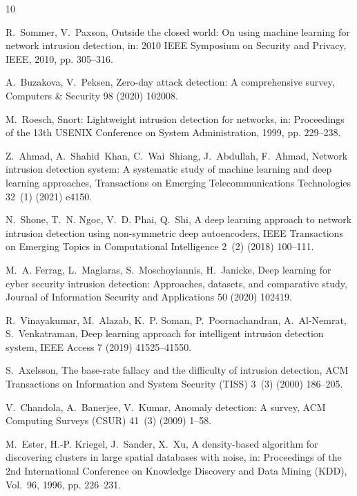 \documentclass[preprint,12pt]{elsarticle}
\begin{document}

\begin{thebibliography}{10}

R.~Sommer, V.~Paxson,
\newblock Outside the closed world: On using machine learning for network intrusion detection,
\newblock in: 2010 IEEE Symposium on Security and Privacy, IEEE, 2010, pp. 305--316.

A.~Buzakova, V.~Peksen,
\newblock Zero-day attack detection: A comprehensive survey,
\newblock Computers \& Security 98 (2020) 102008.

M.~Roesch,
\newblock Snort: Lightweight intrusion detection for networks,
\newblock in: Proceedings of the 13th USENIX Conference on System Administration, 1999, pp. 229--238.

Z.~Ahmad, A.~Shahid~Khan, C.~Wai~Shiang, J.~Abdullah, F.~Ahmad,
\newblock Network intrusion detection system: A systematic study of machine learning and deep learning approaches,
\newblock Transactions on Emerging Telecommunications Technologies 32~(1) (2021) e4150.

N.~Shone, T.~N. Ngoc, V.~D. Phai, Q.~Shi,
\newblock A deep learning approach to network intrusion detection using non-symmetric deep autoencoders,
\newblock IEEE Transactions on Emerging Topics in Computational Intelligence 2~(2) (2018) 100--111.

M.~A. Ferrag, L.~Maglaras, S.~Moschoyiannis, H.~Janicke,
\newblock Deep learning for cyber security intrusion detection: Approaches, datasets, and comparative study,
\newblock Journal of Information Security and Applications 50 (2020) 102419.

R.~Vinayakumar, M.~Alazab, K.~P. Soman, P.~Poornachandran, A.~Al-Nemrat, S.~Venkatraman,
\newblock Deep learning approach for intelligent intrusion detection system,
\newblock IEEE Access 7 (2019) 41525--41550.

S.~Axelsson,
\newblock The base-rate fallacy and the difficulty of intrusion detection,
\newblock ACM Transactions on Information and System Security (TISS) 3~(3) (2000) 186--205.

V.~Chandola, A.~Banerjee, V.~Kumar,
\newblock Anomaly detection: A survey,
\newblock ACM Computing Surveys (CSUR) 41~(3) (2009) 1--58.

M.~Ester, H.-P. Kriegel, J.~Sander, X.~Xu,
\newblock A density-based algorithm for discovering clusters in large spatial databases with noise,
\newblock in: Proceedings of the 2nd International Conference on Knowledge Discovery and Data Mining (KDD), Vol.~96, 1996, pp. 226--231.


\end{thebibliography}
\end{document}
